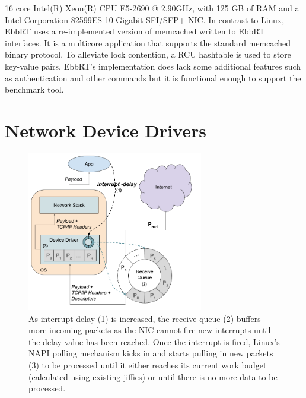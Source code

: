 16 core Intel(R) Xeon(R) CPU E5-2690 @ 2.90GHz, with 125 GB of RAM and a Intel
Corporation 82599ES 10-Gigabit SFI/SFP+ NIC. In contrast to Linux, EbbRT uses a
re-implemented version of memcached written to EbbRT interfaces. It is a
multicore application that supports the standard memcached binary protocol. To
alleviate lock contention, a RCU hashtable is used to store key-value pairs.
EbbRT's implementation does lack some additional features such as
authentication and other commands but it is functional enough to support the
benchmark tool.



\section{Network Device Drivers}
\begin{figure}
  \includegraphics[width=7.7cm]{itr_figure.png}
\caption{As interrupt delay (1) is increased, the receive queue (2) buffers
more incoming packets as the NIC cannot fire new interrupts until the delay
value has been reached. Once the interrupt is fired, Linux's NAPI polling
mechanism kicks in and starts pulling in new packets (3) to be processed until
it either reaches its current work budget (calculated using existing jiffies)
or until there is no more data to be processed.}
  \label{fig:itr_figure}
\end{figure}

